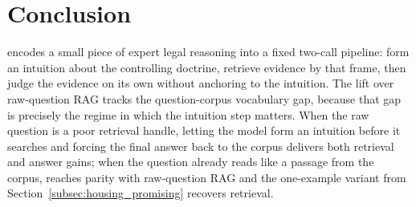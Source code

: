 \section{Conclusion}\label{sec:conclusion}

\hyre{} encodes a small piece of expert legal reasoning into a fixed
two-call pipeline: form an intuition about the controlling doctrine,
retrieve evidence by that frame, then judge the evidence on its own
without anchoring to the intuition. The lift over raw-question RAG tracks
the question-corpus vocabulary gap, because that gap is precisely the
regime in which the intuition step matters. When the raw question is a
poor retrieval handle, letting the model form an intuition before it
searches and forcing the final answer back to the corpus delivers both
retrieval and answer gains; when the question already reads like a passage
from the corpus, \hyre{} reaches parity with raw-question RAG and the
one-example variant from
Section~\ref{subsec:housing_promising} recovers retrieval.
